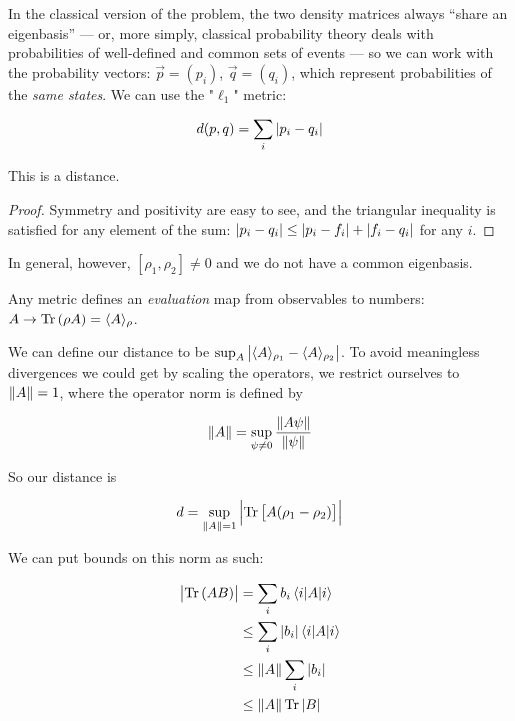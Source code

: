 \documentclass[main.tex]{subfiles}
\begin{document}
In the classical version of the problem, the two density matrices always ``share an eigenbasis'' --- or, more simply, classical probability theory deals with probabilities of well-defined and common sets of events --- so we can work with the probability vectors: \(\vec{p} = (p_i)\), \(\vec{q} = (q_i)\), which represent probabilities of the \emph{same states}.
We can use the "\(\ell_1\)" metric:

\begin{equation}
  d(p, q) = \sum_i \abs{p_i - q_i}
\end{equation}

\begin{claim}
This is a distance.
\end{claim}

\begin{proof}
Symmetry and positivity are easy to see, and the triangular inequality is satisfied for any element of the sum: \(\abs{p_i - q_i} \leq \abs{p_i - f_i} + \abs{f_i - q_i} \) for any \(i\).
\end{proof}

In general, however, \([\rho_1,  \rho_2] \neq 0\) and we do not have a common eigenbasis.

Any metric defines an \emph{evaluation} map from observables to numbers: \(A \rightarrow \operatorname*{Tr} \qty(\rho A) = \langle A \rangle_\rho\).

We can define our distance to be \(\sup_A{\abs{{\langle A \rangle_{\rho_1} - \langle A \rangle_{\rho_2}}}}\). To avoid meaningless divergences we could get by scaling the operators, we restrict ourselves to \(\norm{A} = 1\), where the operator norm is defined by

\begin{equation}
  \norm{A} = \sup_{\psi \neq 0} \frac{\norm{A\psi}}{\norm{\psi}}
\end{equation}

So our distance is

\begin{equation}
  d = \sup_{\norm{A}=1} \abs{\operatorname*{Tr} \qty[A(\rho_1 - \rho_2)]}
\end{equation}

We can put bounds on this norm as such:

\begin{subequations}
\begin{align}
    \abs{\Tr \qty(AB)} &= \sum_i b_i \ev{A}{i} \\
    &\leq \sum_i \abs{b_i} \ev{A}{i} \\
    &\leq \norm{A} \sum_i \abs{b_i} \\
    &\leq \norm{A} \Tr \abs{B}
\end{align}
\end{subequations}
\end{document}
